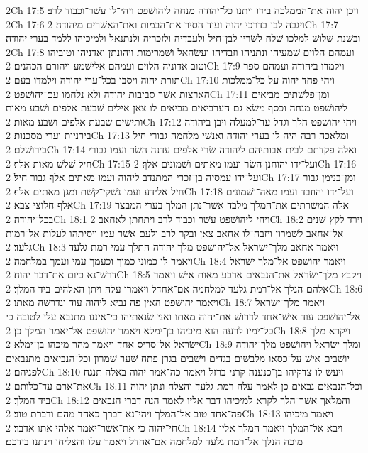 2Ch 17:5  ויכן יהוה את־הממלכה בידו ויתנו כל־יהודה מנחה ליהושׁפט ויהי־לו עשׁר־וכבוד לרב׃
2Ch 17:6  ויגבה לבו בדרכי יהוה ועוד הסיר את־הבמות ואת־האשׁרים מיהודה׃
2Ch 17:7  ובשׁנת שׁלושׁ למלכו שׁלח לשׂריו לבן־חיל ולעבדיה ולזכריה ולנתנאל ולמיכיהו ללמד בערי יהודה׃
2Ch 17:8  ועמהם הלוים שׁמעיהו ונתניהו וזבדיהו ועשׂהאל ושׁמרימות ויהונתן ואדניהו וטוביהו וטוב אדוניה הלוים ועמהם אלישׁמע ויהורם הכהנים׃
2Ch 17:9  וילמדו ביהודה ועמהם ספר תורת יהוה ויסבו בכל־ערי יהודה וילמדו בעם׃
2Ch 17:10  ויהי פחד יהוה על כל־ממלכות הארצות אשׁר סביבות יהודה ולא נלחמו עם־יהושׁפט׃
2Ch 17:11  ומן־פלשׁתים מביאים ליהושׁפט מנחה וכסף משׂא גם הערביאים מביאים לו צאן אילים שׁבעת אלפים ושׁבע מאות ותישׁים שׁבעת אלפים ושׁבע מאות׃
2Ch 17:12  ויהי יהושׁפט הלך וגדל עד־למעלה ויבן ביהודה בירניות וערי מסכנות׃
2Ch 17:13  ומלאכה רבה היה לו בערי יהודה ואנשׁי מלחמה גבורי חיל בירושׁלם׃
2Ch 17:14  ואלה פקדתם לבית אבותיהם ליהודה שׂרי אלפים עדנה השׂר ועמו גבורי חיל שׁלשׁ מאות אלף׃
2Ch 17:15  ועל־ידו יהוחנן השׂר ועמו מאתים ושׁמונים אלף׃
2Ch 17:16  ועל־ידו עמסיה בן־זכרי המתנדב ליהוה ועמו מאתים אלף גבור חיל׃
2Ch 17:17  ומן־בנימן גבור חיל אלידע ועמו נשׁקי־קשׁת ומגן מאתים אלף׃
2Ch 17:18  ועל־ידו יהוזבד ועמו מאה־ושׁמונים אלף חלוצי צבא׃
2Ch 17:19  אלה המשׁרתים את־המלך מלבד אשׁר־נתן המלך בערי המבצר בכל־יהודה׃
2Ch 18:1  ויהי ליהושׁפט עשׁר וכבוד לרב ויתחתן לאחאב׃
2Ch 18:2  וירד לקץ שׁנים אל־אחאב לשׁמרון ויזבח־לו אחאב צאן ובקר לרב ולעם אשׁר עמו ויסיתהו לעלות אל־רמות גלעד׃
2Ch 18:3  ויאמר אחאב מלך־ישׂראל אל־יהושׁפט מלך יהודה התלך עמי רמת גלעד ויאמר לו כמוני כמוך וכעמך עמי ועמך במלחמה׃
2Ch 18:4  ויאמר יהושׁפט אל־מלך ישׂראל דרשׁ־נא כיום את־דבר יהוה׃
2Ch 18:5  ויקבץ מלך־ישׂראל את־הנבאים ארבע מאות אישׁ ויאמר אלהם הנלך אל־רמת גלעד למלחמה אם־אחדל ויאמרו עלה ויתן האלהים ביד המלך׃
2Ch 18:6  ויאמר יהושׁפט האין פה נביא ליהוה עוד ונדרשׁה מאתו׃
2Ch 18:7  ויאמר מלך־ישׂראל אל־יהושׁפט עוד אישׁ־אחד לדרושׁ את־יהוה מאתו ואני שׂנאתיהו כי־איננו מתנבא עלי לטובה כי כל־ימיו לרעה הוא מיכיהו בן־ימלא ויאמר יהושׁפט אל־יאמר המלך כן׃
2Ch 18:8  ויקרא מלך ישׂראל אל־סריס אחד ויאמר מהר מיכהו בן־ימלא׃
2Ch 18:9  ומלך ישׂראל ויהושׁפט מלך־יהודה יושׁבים אישׁ על־כסאו מלבשׁים בגדים וישׁבים בגרן פתח שׁער שׁמרון וכל־הנביאים מתנבאים לפניהם׃
2Ch 18:10  ויעשׂ לו צדקיהו בן־כנענה קרני ברזל ויאמר כה־אמר יהוה באלה תנגח את־ארם עד־כלותם׃
2Ch 18:11  וכל־הנבאים נבאים כן לאמר עלה רמת גלעד והצלח ונתן יהוה ביד המלך׃
2Ch 18:12  והמלאך אשׁר־הלך לקרא למיכיהו דבר אליו לאמר הנה דברי הנבאים פה־אחד טוב אל־המלך ויהי־נא דברך כאחד מהם ודברת טוב׃
2Ch 18:13  ויאמר מיכיהו חי־יהוה כי את־אשׁר־יאמר אלהי אתו אדבר׃
2Ch 18:14  ויבא אל־המלך ויאמר המלך אליו מיכה הנלך אל־רמת גלעד למלחמה אם־אחדל ויאמר עלו והצליחו וינתנו בידכם׃
